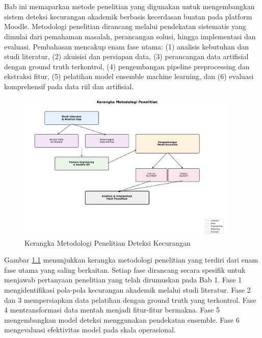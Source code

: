 \chapter{\babTiga}
\label{bab:3}
Bab ini memaparkan metode penelitian yang digunakan untuk mengembangkan sistem deteksi kecurangan akademik berbasis kecerdasan buatan pada platform Moodle. Metodologi penelitian dirancang melalui pendekatan sistematis yang dimulai dari pemahaman masalah, perancangan solusi, hingga implementasi dan evaluasi. Pembahasan mencakup enam fase utama: (1) analisis kebutuhan dan studi literatur, (2) akuisisi dan persiapan data, (3) perancangan data artifisial dengan ground truth terkontrol, (4) pengembangan pipeline preprocessing dan ekstraksi fitur, (5) pelatihan model ensemble machine learning, dan (6) evaluasi komprehensif pada data riil dan artifisial.

\begin{figure}[htbp]
    \centering
    \includegraphics[width=0.95\textwidth]{newfigures/research_methodology_stages.pdf}
    \caption{Kerangka Metodologi Penelitian Deteksi Kecurangan}
    \label{fig:research_stages}
\end{figure}

Gambar \ref{fig:research_stages} menunjukkan kerangka metodologi penelitian yang terdiri dari enam fase utama yang saling berkaitan. Setiap fase dirancang secara spesifik untuk menjawab pertanyaan penelitian yang telah dirumuskan pada Bab 1. Fase 1 mengidentifikasi pola-pola kecurangan akademik melalui studi literatur. Fase 2 dan 3 mempersiapkan data pelatihan dengan ground truth yang terkontrol. Fase 4 mentransformasi data mentah menjadi fitur-fitur bermakna. Fase 5 mengembangkan model deteksi menggunakan pendekatan ensemble. Fase 6 mengevaluasi efektivitas model pada skala operasional.

